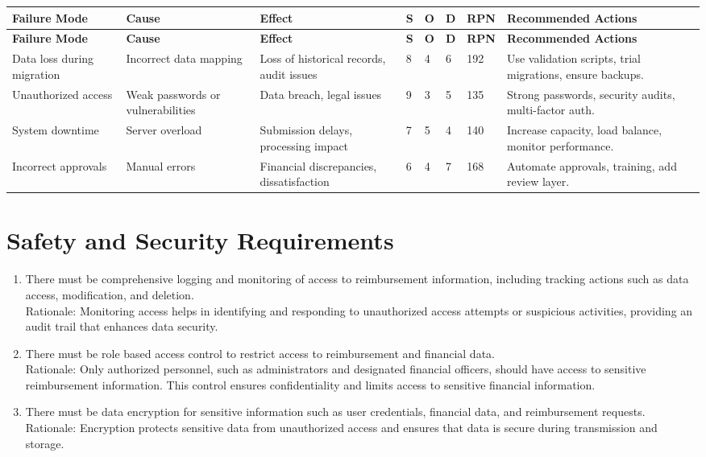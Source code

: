 \documentclass{article}
\begin{document}
\begin{longtable}{|p{2.2cm}|p{2.2cm}|p{2.2cm}|p{0.6cm}|p{0.6cm}|p{0.6cm}|p{0.6cm}|p{3cm}|}
    \hline
    \textbf{Failure Mode} & \textbf{Cause} & \textbf{Effect} & \textbf{S} & \textbf{O} & \textbf{D} & \textbf{RPN} & \textbf{Recommended Actions} \\ \hline
    \endfirsthead
    
    \hline
    \textbf{Failure Mode} & \textbf{Cause} & \textbf{Effect} & \textbf{S} & \textbf{O} & \textbf{D} & \textbf{RPN} & \textbf{Recommended Actions} \\ \hline
    \endhead
    
    Data loss during migration & Incorrect data mapping & Loss of historical records, audit issues & 8 & 4 & 6 & 192 & Use validation scripts, trial migrations, ensure backups. \\ \hline
    Unauthorized access & Weak passwords or vulnerabilities & Data breach, legal issues & 9 & 3 & 5 & 135 & Strong passwords, security audits, multi-factor auth. \\ \hline
    System downtime & Server overload & Submission delays, processing impact & 7 & 5 & 4 & 140 & Increase capacity, load balance, monitor performance. \\ \hline
    Incorrect approvals & Manual errors & Financial discrepancies, dissatisfaction & 6 & 4 & 7 & 168 & Automate approvals, training, add review layer. \\ \hline

\end{longtable}



\section{Safety and Security Requirements}

\begin{enumerate}
    \item There must be comprehensive logging and monitoring of access to reimbursement information, including tracking actions such as data access, modification, and deletion. \\
    Rationale: Monitoring access helps in identifying and responding to unauthorized access attempts or suspicious activities, providing an audit trail that enhances data security.
    \item There must be role based access control to restrict access to reimbursement and financial data. \\
    Rationale: Only authorized personnel, such as administrators and designated financial officers, should have access to sensitive reimbursement information. This control ensures confidentiality and limits access to sensitive financial information.
    \item There must be data encryption for sensitive information such as user credentials, financial data, and reimbursement requests. \\
    Rationale: Encryption protects sensitive data from unauthorized access and ensures that data is secure during transmission and storage.
\end{enumerate}
\end{document}
